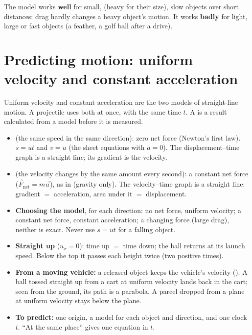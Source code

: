 The model works \textbf{well} for small,  (heavy for their size), slow objects over
short distances: drag hardly changes a heavy object's motion. It works \textbf{badly} for light,
large or fast objects (a feather, a golf ball after a drive).

\section{Predicting motion: uniform velocity and constant acceleration}\label{ch1:sec:predict}

Uniform velocity and constant acceleration are the two models of straight-line motion. A
projectile uses both at once, with the same time $t$. A  is a result
calculated from a model before it is measured.

\begin{itemize}
  \item {} (the same speed in the same direction): zero net force
        (Newton's first law). $s = ut$ and $v = u$ (the sheet equations with $a = 0$). The
        displacement--time graph is a straight line; its gradient is the velocity.
  \item {} (the velocity changes by the same amount every second): a
        constant net force ($\vec{F}_\mathrm{net} = m\vec{a}$), as in  (gravity
        only). The velocity--time graph is a straight line: gradient $=$ acceleration, area
        under it $=$ displacement.
  \item \textbf{Choosing the model}, for each direction: no net force, uniform velocity; a constant net
        force, constant acceleration; a changing force (large drag), neither is exact. Never
        use $s = ut$ for a falling object.
  \item \textbf{Straight up} ($u_x = 0$): time up $=$ time down; the ball returns at its launch
        speed. Below the top it passes each height twice (two positive times).
  \item \textbf{From a moving vehicle:} a released object keeps the vehicle's velocity
        (). A ball tossed straight up from a cart at uniform velocity lands back
        in the cart; seen from the ground, its path is a parabola. A parcel dropped from a plane
        at uniform velocity stays below the plane.
  \item \textbf{To predict:} one origin, a model for each object and direction, and one clock
        $t$. ``At the same place'' gives one equation in $t$.
\end{itemize}

